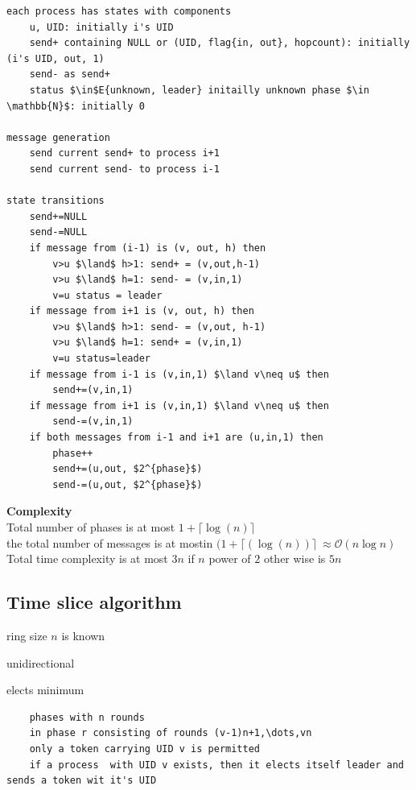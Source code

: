 \begin{lstlisting}
each process has states with components
	u, UID: initially i's UID
	send+ containing NULL or (UID, flag{in, out}, hopcount): initially (i's UID, out, 1)
	send- as send+
	status $\in$E{unknown, leader} initailly unknown phase $\in \mathbb{N}$: initially 0

message generation
	send current send+ to process i+1
	send current send- to process i-1

state transitions
	send+=NULL
	send-=NULL
	if message from (i-1) is (v, out, h) then
		v>u $\land$ h>1: send+ = (v,out,h-1)
		v>u $\land$ h=1: send- = (v,in,1)
		v=u status = leader
	if message from i+1 is (v, out, h) then
		v>u $\land$ h>1: send- = (v,out, h-1)
		v>u $\land$ h=1: send+ = (v,in,1)
		v=u status=leader
	if message from i-1 is (v,in,1) $\land v\neq u$ then
		send+=(v,in,1)
	if message from i+1 is (v,in,1) $\land v\neq u$ then
		send-=(v,in,1)
	if both messages from i-1 and i+1 are (u,in,1) then
		phase++
		send+=(u,out, $2^{phase}$)
		send-=(u,out, $2^{phase}$)
\end{lstlisting}
\textbf{Complexity}\\
Total number of phases is at most $1+\lceil\log(n)\rceil$\\
the total number of messages is at mostin $(1+\lceil(\log(n))\rceil\ \approx \mathcal{O}(n\log n)$\\
Total time complexity is at most $3n$ if $n$ power of $2$ other wise is $5n$\\

\subsection{Time slice algorithm}
\begin{compactitem}
\item ring size $n$ is known
\item unidirectional
\item elects minimum
\end{compactitem}


\begin{lstlisting}
	phases with n rounds
	in phase r consisting of rounds (v-1)n+1,\dots,vn
	only a token carrying UID v is permitted
	if a process  with UID v exists, then it elects itself leader and sends a token wit it's UID
\end{lstlisting}

